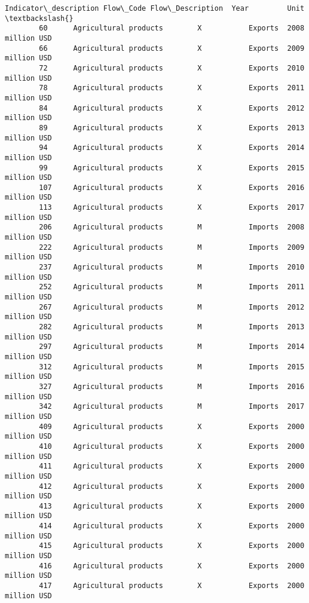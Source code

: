\documentclass[11pt]{article}
\begin{document}
\begin{Verbatim}[commandchars=\\\{\}]
                Indicator\_description Flow\_Code Flow\_Description  Year         Unit  \textbackslash{}
        60      Agricultural products        X           Exports  2008  million USD   
        66      Agricultural products        X           Exports  2009  million USD   
        72      Agricultural products        X           Exports  2010  million USD   
        78      Agricultural products        X           Exports  2011  million USD   
        84      Agricultural products        X           Exports  2012  million USD   
        89      Agricultural products        X           Exports  2013  million USD   
        94      Agricultural products        X           Exports  2014  million USD   
        99      Agricultural products        X           Exports  2015  million USD   
        107     Agricultural products        X           Exports  2016  million USD   
        113     Agricultural products        X           Exports  2017  million USD   
        206     Agricultural products        M           Imports  2008  million USD   
        222     Agricultural products        M           Imports  2009  million USD   
        237     Agricultural products        M           Imports  2010  million USD   
        252     Agricultural products        M           Imports  2011  million USD   
        267     Agricultural products        M           Imports  2012  million USD   
        282     Agricultural products        M           Imports  2013  million USD   
        297     Agricultural products        M           Imports  2014  million USD   
        312     Agricultural products        M           Imports  2015  million USD   
        327     Agricultural products        M           Imports  2016  million USD   
        342     Agricultural products        M           Imports  2017  million USD   
        409     Agricultural products        X           Exports  2000  million USD   
        410     Agricultural products        X           Exports  2000  million USD   
        411     Agricultural products        X           Exports  2000  million USD   
        412     Agricultural products        X           Exports  2000  million USD   
        413     Agricultural products        X           Exports  2000  million USD   
        414     Agricultural products        X           Exports  2000  million USD   
        415     Agricultural products        X           Exports  2000  million USD   
        416     Agricultural products        X           Exports  2000  million USD   
        417     Agricultural products        X           Exports  2000  million USD   

\end{Verbatim}
\end{document}
